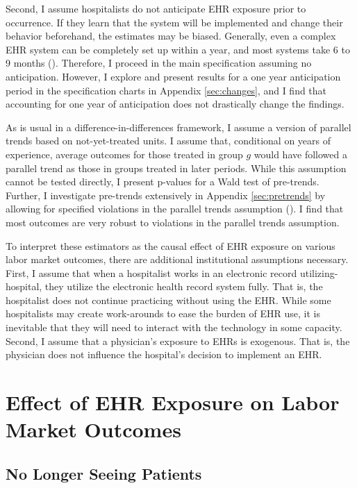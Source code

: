 \documentclass[12pt]{article}
\begin{document}
Second, I assume hospitalists do not anticipate EHR exposure prior to occurrence. If they learn that the system will be implemented and change their behavior beforehand, the estimates may be biased. Generally, even a complex EHR system can be completely set up within a year, and most systems take 6 to 9 months (\cite{uzialko_2021}). Therefore, I proceed in the main specification assuming no anticipation. However, I explore and present results for a one year anticipation period in the specification charts in Appendix \ref{sec:changes}, and I find that accounting for one year of anticipation does not drastically change the findings.  

As is usual in a difference-in-differences framework, I assume a version of parallel trends based on not-yet-treated units. I assume that, conditional on years of experience, average outcomes for those treated in group $g$ would have followed a parallel trend as those in groups treated in later periods. While this assumption cannot be tested directly, I present p-values for a Wald test of pre-trends. Further, I investigate pre-trends extensively in Appendix \ref{sec:pretrends} by allowing for specified violations in the parallel trends assumption (\cite{rambachan2019honest}). I find that most outcomes are very robust to violations in the parallel trends assumption. 

To interpret these estimators as the causal effect of EHR exposure on various labor market outcomes, there are additional institutional assumptions necessary. First, I assume that when a hospitalist works in an electronic record utilizing-hospital, they utilize the electronic health record system fully. That is, the hospitalist does not continue practicing without using the EHR. While some hospitalists may create work-arounds to ease the burden of EHR use, it is inevitable that they will need to interact with the technology in some capacity. Second, I assume that a physician's exposure to EHRs is exogenous. That is, the physician does not influence the hospital's decision to implement an EHR.


\section{Effect of EHR Exposure on Labor Market Outcomes}


\subsection{No Longer Seeing Patients}\label{sec:retire}
\end{document}

